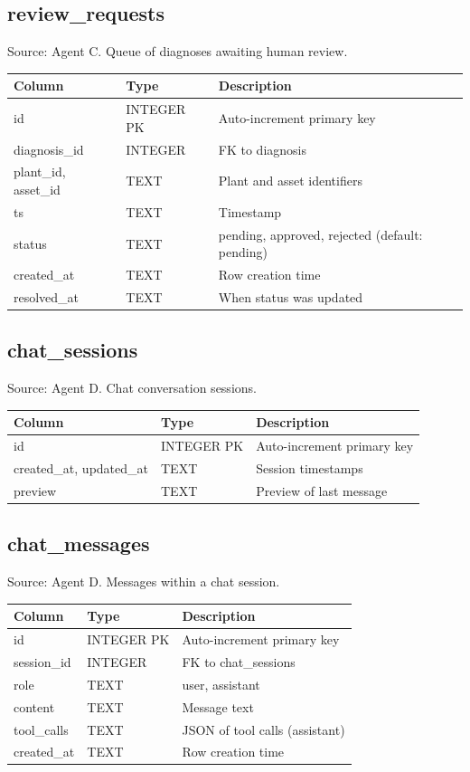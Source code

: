 \documentclass[12pt,letterpaper]{report}
\begin{document}
\subsection*{review\_requests}
Source: Agent C. Queue of diagnoses awaiting human review.

\begin{tabular}{@{}llp{5.5cm}@{}}
\toprule
\textbf{Column} & \textbf{Type} & \textbf{Description} \\
\midrule
id & INTEGER PK & Auto-increment primary key \\
diagnosis\_id & INTEGER & FK to diagnosis \\
plant\_id, asset\_id & TEXT & Plant and asset identifiers \\
ts & TEXT & Timestamp \\
status & TEXT & pending, approved, rejected (default: pending) \\
created\_at & TEXT & Row creation time \\
resolved\_at & TEXT & When status was updated \\
\bottomrule
\end{tabular}

\subsection*{chat\_sessions}
Source: Agent D. Chat conversation sessions.

\begin{tabular}{@{}llp{5.5cm}@{}}
\toprule
\textbf{Column} & \textbf{Type} & \textbf{Description} \\
\midrule
id & INTEGER PK & Auto-increment primary key \\
created\_at, updated\_at & TEXT & Session timestamps \\
preview & TEXT & Preview of last message \\
\bottomrule
\end{tabular}

\subsection*{chat\_messages}
Source: Agent D. Messages within a chat session.

\begin{tabular}{@{}llp{5.5cm}@{}}
\toprule
\textbf{Column} & \textbf{Type} & \textbf{Description} \\
\midrule
id & INTEGER PK & Auto-increment primary key \\
session\_id & INTEGER & FK to chat\_sessions \\
role & TEXT & user, assistant \\
content & TEXT & Message text \\
tool\_calls & TEXT & JSON of tool calls (assistant) \\
created\_at & TEXT & Row creation time \\
\bottomrule
\end{tabular}
\end{document}
